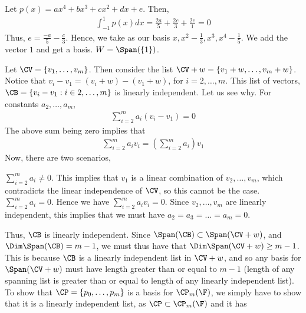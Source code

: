\documentclass{book}
\begin{document}
\begin{enumerate}[label=\arabic*)]
\begin{enumerate}[label=\arabic*)]
      \ii
      \ii
    \end{enumerate}
    \ii
      \begin{enumerate}[label=\arabic*)]
        \ii 
          Let $p(x) = ax^4 + bx^3 + cx^2 + dx + e$. Then,
          \begin{align*}
            \int_{-1}^{1}p(x)dx = \frac{2a}{5} + \frac{2c}{3} + \frac{2e}{1} = 0
          \end{align*}
          Thus, $e = \frac{-a}{5} - \frac{c}{3}$. Hence, we take as our basis $x, x^2 - \frac{1}{3}, x^3, x^4 - \frac{1}{5}$.
        \ii
          We add the vector $1$ and get a basis.
        \ii
          $W = \Span(\{1\})$.
      \end{enumerate}
    \ii
      Let $\CV = \{v_1, \dots, v_m\}$. Then consider the list $\CV + w = \{v_1 + w, \dots, v_m + w\}$. Notice that $v_i - v_1 = (v_i + w) - (v_1 + w)$, for $i = 2, \dots, m$.
      This list of vectors, $\CB = \{v_i - v_1: i \in 2, \dots, m\}$ is linearly independent. Let us see why. For constants $a_2, \dots, a_m$,
      \begin{align*}
        \sum_{i = 2}^{m}a_i(v_i - v_1) = 0
      \end{align*}
      The above sum being zero implies that 
      \begin{align*}
        \sum_{i = 2}^{m}a_iv_i = (\sum_{i = 2}^{m}a_i)v_1
      \end{align*}
      Now, there are two scenarios,
      \begin{enumerate}[label=\roman*)]
        \ii $\sum_{i = 2}^{m}a_i \neq 0$. This implies that $v_1$ is a linear combination of $v_2, \dots, v_m$, which contradicts the linear independence of $\CV$, so this
        cannot be the case.
        \ii $\sum_{i = 2}^{m}a_i = 0$. Hence we have $\sum_{i = 2}^{m}a_iv_i = 0$. Since $v_2, \dots, v_m$ are linearly independent, this implies that we must have $a_2 = a_3
        = \dots = a_m = 0$.
      \end{enumerate}
      Thus, $\CB$ is linearly independent. Since $\Span(\CB) \subset \Span(\CV + w)$, and $\Dim\Span(\CB) = m - 1$, we must thus have that $\Dim\Span(\CV + w) \geq m - 1$.
      This is because $\CB$ is a linearly independent list in $\CV + w$, and so any basis for $\Span(\CV + w)$ must have length greater than or equal to $m - 1$ (length of any
      spanning list is greater than or equal to length of any linearly independent list).
    \ii
      To show that $\CP = \{p_0, \dots, p_m\}$ is a basis for $\CP_m(\F)$, we simply have to show that it is a linearly independent list, as $\CP \subset \CP_m(\F)$ and it has

\end{enumerate}
\end{document}
